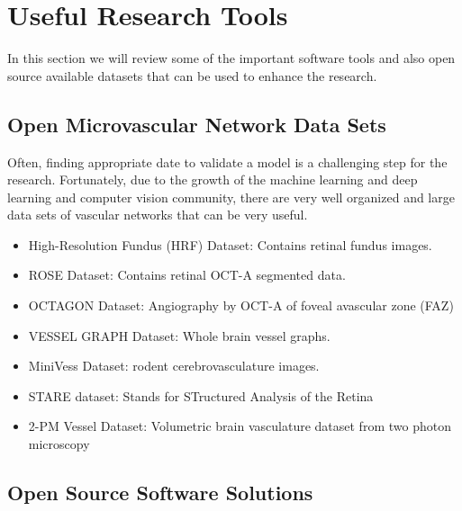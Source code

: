 \documentclass[10pt,a4paper,twocolumn]{article}
\begin{document}
	
	\section{Useful Research Tools}
	In this section we will review some of the important software tools and also open source available datasets that can be used to enhance the research.
	\subsection{Open Microvascular Network Data Sets}
	Often, finding appropriate date to validate a model is a challenging step for the research. Fortunately, due to the growth of the machine learning and deep learning and computer vision community, there are very well organized and large data sets of vascular networks that can be very useful.
	\begin{itemize}
		\item High-Resolution Fundus (HRF) Dataset: Contains retinal fundus images.
		\item ROSE Dataset: Contains retinal OCT-A segmented data.
		\item OCTAGON Dataset: Angiography by OCT-A of foveal avascular zone (FAZ)
		\item VESSEL GRAPH Dataset: Whole brain vessel graphs.
		\item MiniVess Dataset: rodent cerebrovasculature images.
		\item STARE dataset: Stands for STructured Analysis of the Retina
		\item 2-PM Vessel Dataset: Volumetric brain vasculature dataset from two photon microscopy
	\end{itemize}
	
	\subsection{Open Source Software Solutions}
\end{document}
